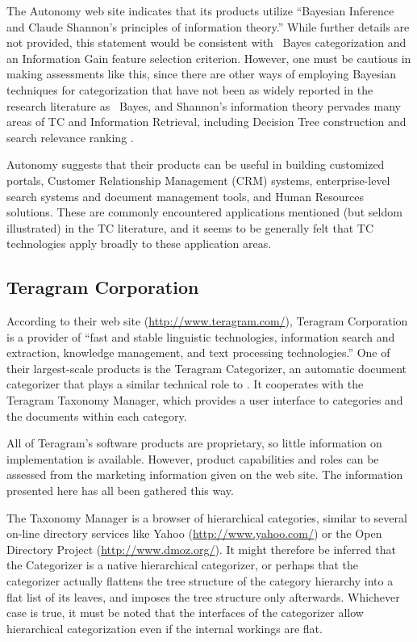 The Autonomy web site indicates that its products utilize ``Bayesian
Inference and Claude Shannon's principles of information theory.''
While further details are not provided, this statement would be
consistent with \naive\ Bayes categorization and an Information Gain
feature selection criterion.  However, one must be cautious in making
assessments like this, since there are other ways of employing
Bayesian techniques for categorization that have not been as widely
reported in the research literature as \naive\ Bayes, and Shannon's
information theory pervades many areas of TC and Information
Retrieval, including Decision Tree construction
\cite{quinlan:89,wallace:93} and search relevance ranking
\cite{greiff:00}.

Autonomy suggests that their products can be useful in building
customized portals, Customer Relationship Management (CRM) systems,
enterprise-level search systems and document management tools, and
Human Resources solutions.  These are commonly encountered
applications mentioned (but seldom illustrated) in the TC literature,
and it seems to be generally felt that TC technologies apply broadly
to these application areas.

\subsection{Teragram Corporation}

According to their web site (\url{http://www.teragram.com/}), Teragram
Corporation is a provider of ``fast and stable linguistic
technologies, information search and extraction, knowledge management,
and text processing technologies.''  One of their largest-scale
products is the Teragram Categorizer, an automatic document
categorizer that plays a similar technical role to \aicat.
It cooperates with the Teragram Taxonomy Manager, which provides a
user interface to categories and the documents within each category.

All of Teragram's software products are proprietary, so little
information on implementation is available.  However, product
capabilities and roles can be assessed from the marketing information
given on the web site.  The information presented here has all been
gathered this way.

The Taxonomy Manager is a browser of hierarchical categories, similar
to several on-line directory services like Yahoo
(\url{http://www.yahoo.com/}) or the Open Directory Project
(\url{http://www.dmoz.org/}).  It might therefore be inferred that the
Categorizer is a native hierarchical categorizer, or perhaps that the
categorizer actually flattens the tree structure of the category
hierarchy into a flat list of its leaves, and imposes the tree
structure only afterwards.  Whichever case is true, it must be noted
that the interfaces of the categorizer allow hierarchical
categorization even if the internal workings are flat.

